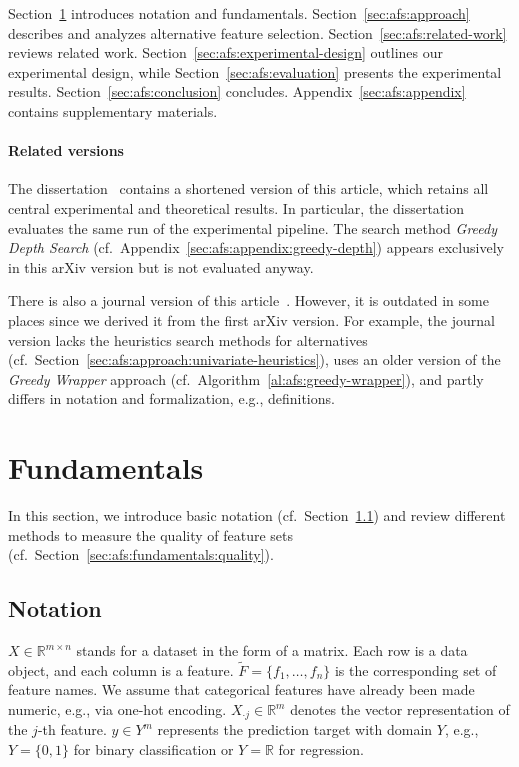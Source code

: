 \documentclass{article}
\theoremstyle{definition}
\begin{document}
Section~\ref{sec:afs:fundamentals} introduces notation and fundamentals.
Section~\ref{sec:afs:approach} describes and analyzes alternative feature selection.
Section~\ref{sec:afs:related-work} reviews related work.
Section~\ref{sec:afs:experimental-design} outlines our experimental design, while Section~\ref{sec:afs:evaluation} presents the experimental results.
Section~\ref{sec:afs:conclusion} concludes.
Appendix~\ref{sec:afs:appendix} contains supplementary materials.

\paragraph{Related versions}

The dissertation~\cite{bach2025leveraging} contains a shortened version of this article, which retains all central experimental and theoretical results.
In particular, the dissertation evaluates the same run of the experimental pipeline.
The search method \emph{Greedy Depth Search} (cf.~Appendix~\ref{sec:afs:appendix:greedy-depth}) appears exclusively in this arXiv version but is not evaluated anyway.

There is also a journal version of this article~\cite{bach2024alternative}.
However, it is outdated in some places since we derived it from the first arXiv version.
For example, the journal version lacks the heuristics search methods for alternatives (cf.~Section~\ref{sec:afs:approach:univariate-heuristics}), uses an older version of the \emph{Greedy Wrapper} approach (cf.~Algorithm~\ref{al:afs:greedy-wrapper}), and partly differs in notation and formalization, e.g., definitions.

\section{Fundamentals}
\label{sec:afs:fundamentals}

In this section, we introduce basic notation (cf.~Section~\ref{sec:afs:fundamentals:notation}) and review different methods to measure the quality of feature sets (cf.~Section~\ref{sec:afs:fundamentals:quality}).

\subsection{Notation}
\label{sec:afs:fundamentals:notation}

$X \in \mathbb{R}^{m \times n}$ stands for a dataset in the form of a matrix.
Each row is a data object, and each column is a feature.
$\tilde{F} = \{f_1, \dots, f_n\}$ is the corresponding set of feature names.
We assume that categorical features have already been made numeric, e.g., via one-hot encoding.
$X_{\cdot{}j} \in \mathbb{R}^m$ denotes the vector representation of the $j$-th feature.
$y \in Y^m$ represents the prediction target with domain $Y$, e.g., $Y=\{0,1\}$ for binary classification or $Y=\mathbb{R}$ for regression.
\end{document}
